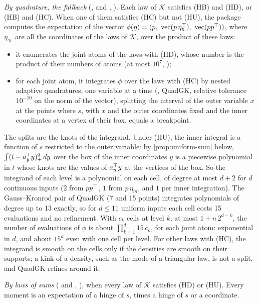 \documentclass[11pt,a4paper]{article}
\numberwithin{equation}{section}
\newcommand{\pos}[1]{(#1)_+}            %
\newcommand{\Hyp}[1]{\textup{(H#1)}}    %
\begin{document}
\emph{By quadrature, the fallback} (,  and , ).
Each law of $\mathcal{K}$ satisfies \Hyp{B} and \Hyp{D}, or \Hyp{B} and \Hyp{C}.
When one of them satisfies \Hyp{C} but not \Hyp{U}, the package computes the expectation of the vector $\phi(\eta) = (p,\ \operatorname{vec}(p\,\eta_{\mathcal K}^\T),\ \operatorname{vec}(pp^\T))$,
where $\eta_{\mathcal K}$ are all the coordinates of the laws of $\mathcal{K}$, over the product of these laws:
\begin{itemize}[nosep]
\item it enumerates the joint atoms of the laws with \Hyp{D}, whose number is the product of their numbers of atoms (at most $10^7$, );
\item for each joint atom, it integrates $\phi$ over the laws with \Hyp{C} by nested adaptive quadratures, one variable at a time (, QuadGK, relative tolerance $10^{-10}$ on the norm of the vector),
splitting the interval of the outer variable $x$ at the points where $s$, with $x$ and the outer coordinates fixed and the inner coordinates at a vertex of their box, equals a breakpoint.
\end{itemize}
The splits are the knots of the integrand.
Under \Hyp{U}, the inner integral is a function of $s$ restricted to the outer variable: by \cref{prop:uniform-sum} below,
$\int \pos{t - a_y^\T y}^q\,dy$ over the box of the inner coordinates $y$ is a piecewise polynomial in $t$ whose knots are the values of $a_y^\top y$ at the vertices of the box.
So the integrand of each level is a polynomial on each cell, of degree at most $d + 2$ for $d$ continuous inputs
($2$ from $pp^\top$, $1$ from $p\,\eta_m$, and $1$ per inner integration).
The Gauss--Kronrod pair of QuadGK (7 and 15 points) integrates polynomials of degree up to 13 exactly,
so for $d \le 11$ uniform inputs each cell costs 15 evaluations and no refinement.
With $c_k$ cells at level $k$, at most $1 + n\,2^{d-k}$, the number of evaluations of $\phi$ is about $\prod_{k=1}^d 15\,c_k$, for each joint atom:
exponential in $d$, and about $15^d$ even with one cell per level.
For other laws with \Hyp{C}, the integrand is smooth on the cells only if the densities are smooth on their supports;
a kink of a density, such as the mode of a triangular law, is not a split, and QuadGK refines around it.

\emph{By laws of sums} ( and , ),
when every law of $\mathcal{K}$ satisfies \Hyp{D} or \Hyp{U}.
Every moment is an expectation of a hinge of $s$, times a hinge of $s$ or a coordinate.
\end{document}
